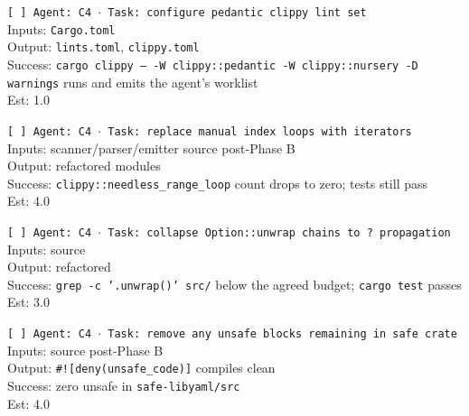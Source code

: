 \documentclass[12pt]{article}
\theoremstyle{definition}
\theoremstyle{remark}
\begin{document}
\begin{small}
\noindent\texttt{[ ] Agent: C4 $\cdot$ Task: configure pedantic clippy lint set}\\
\hspace*{2em}Inputs: \texttt{Cargo.toml}\\
\hspace*{2em}Output: \texttt{lints.toml}, \texttt{clippy.toml}\\
\hspace*{2em}Success: \texttt{cargo clippy -- -W clippy::pedantic -W clippy::nursery -D warnings} runs and emits the agent's worklist\\
\hspace*{2em}Est: 1.0

\noindent\texttt{[ ] Agent: C4 $\cdot$ Task: replace manual index loops with iterators}\\
\hspace*{2em}Inputs: scanner/parser/emitter source post-Phase B\\
\hspace*{2em}Output: refactored modules\\
\hspace*{2em}Success: \texttt{clippy::needless\_range\_loop} count drops to zero; tests still pass\\
\hspace*{2em}Est: 4.0

\noindent\texttt{[ ] Agent: C4 $\cdot$ Task: collapse Option::unwrap chains to ? propagation}\\
\hspace*{2em}Inputs: source\\
\hspace*{2em}Output: refactored\\
\hspace*{2em}Success: \texttt{grep -c '.unwrap()' src/} below the agreed budget; \texttt{cargo test} passes\\
\hspace*{2em}Est: 3.0

\noindent\texttt{[ ] Agent: C4 $\cdot$ Task: remove any unsafe blocks remaining in safe crate}\\
\hspace*{2em}Inputs: source post-Phase B\\
\hspace*{2em}Output: \texttt{\#![deny(unsafe\_code)]} compiles clean\\
\hspace*{2em}Success: zero unsafe in \texttt{safe-libyaml/src}\\
\hspace*{2em}Est: 4.0


\end{small}
\end{document}
